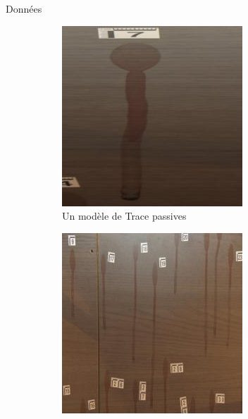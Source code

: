 \documentclass[11pt]{beamer}
\begin{document}
\begin{frame}{Données}
    \begin{figure}[ht]
        \centering
        \begin{subfigure}{0.32\textwidth}
            \centering
            \includegraphics[width=\linewidth]{../asset/67.jpg}
            \caption{Un modèle de Trace passives}
        \end{subfigure}
        \begin{subfigure}{0.32\textwidth}
            \centering
            \includegraphics[width=\linewidth]{../asset/35.jpg}

\end{subfigure}
\end{figure}
\end{frame}
\end{document}
